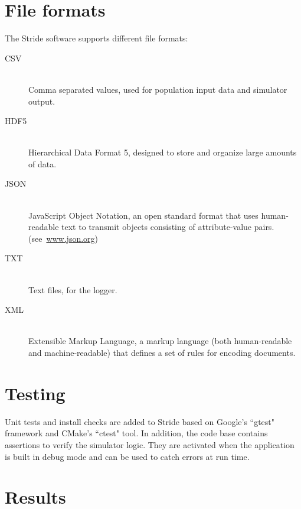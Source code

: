 \section{File formats}
\label{section:FileFormats}

The Stride software supports different file formats: 
\begin{description}
	\item [CSV] \ \\
	Comma separated values, used for population input data and simulator output.
	\item [HDF5] \ \\
	Hierarchical Data Format 5, designed to store and organize large amounts of data.
	\item [JSON] \ \\
	JavaScript Object Notation, an open standard format that uses human-readable text to transmit objects consisting of attribute-value pairs. 	 \mbox{(see \url{www.json.org})}
	\item [TXT] \ \\
	Text files, for the logger. 
	\item [XML] \ \\
	Extensible Markup Language, a markup language (both human-readable and machine-readable) that defines a set of rules for encoding documents.
\end{description}


%
\section{Testing}
Unit tests and install checks are added to Stride based on Google's ``gtest" framework and CMake's ``ctest" tool. 
In addition, the code base contains assertions to verify the simulator logic. 
They are activated when the application is built in debug mode and can be used to catch errors at run time. 


\section{Results}
\label{section:Results}

